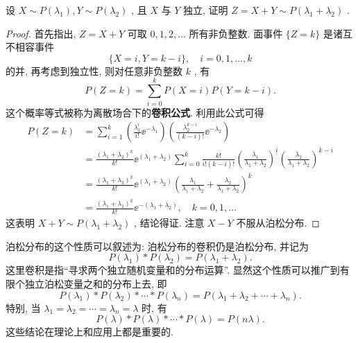    \begin{example}[(泊松分布的可加性)]\label{exam:3.3.2}
   	设 $X\sim P(\lambda_{1}),Y\sim P(\lambda_2)$ , 且 $X$ 与 $Y$ 独立, 证明 $Z=X+Y\sim P(\lambda_{1}+\lambda_{2})$ .
   	\begin{proof}
   		首先指出, $Z=X+Y$ 可取 $0,1,2,\ldots$ 所有非负整数. 面事件 $\{Z=k\}$ 是诸互不相容事件
   		\begin{equation*}
   			\{X=i,Y=k-i\},\quad i=0,1,\ldots,k
   		\end{equation*}
   		的并, 再考虑到独立性, 则对任意非负整数 $k$ , 有
   		\begin{equation}
   			P(Z=k)=\sum_{i=0}^{k}P(X=i)P(Y=k-i).\label{eq:3.3.1}
   		\end{equation}
   		这个概率等式被称为离散场合下的{\bfseries 卷积公式}. 利用此公式可得
   		\begin{align*}
   			P(Z=k) &=\sum_{i=1}^{k}\left(\frac{\lambda_{1}^i}{i!}\ee^{-\lambda_{1}}\right)\left(\frac{\lambda_2^{k-i}}{(k-i)!}\ee^{-\lambda_{2}}\right)\\
   			&=\frac{(\lambda_{1}+\lambda_{2})^k}{k!}\ee^{(\lambda_{1}+\lambda_{2})}\sum_{i=0}^{k}\frac{k!}{i!(k-i)!}\left(\frac{\lambda_{1}}{\lambda_{1}+\lambda_{2}}\right)^i\left(\frac{\lambda_{2}}{\lambda_{1}+\lambda_{2}}\right)^{k-i}\\
   			&=\frac{(\lambda_{1}+\lambda_{2})^k}{k!}\ee^{(\lambda_{1}+\lambda_{2})}\left(\frac{\lambda_{1}}{\lambda_{1}+\lambda_{2}}+\frac{\lambda_{2}}{\lambda_{1}+\lambda_{2}}\right)^k\\
   			&=\frac{(\lambda_{1}+\lambda_{2})^k}{k!}\ee^{-(\lambda_{1}+\lambda_{2})},\quad k=0,1,\ldots
   		\end{align*}
   		这表明 $X+Y\sim P(\lambda_{1}+\lambda_{2})$ , 结论得证. 注意 $X-Y$ 不服从泊松分布.
   	\end{proof}
   \end{example}
   泊松分布的这个性质可以叙述为: 泊松分布的卷积仍是泊松分布, 并记为
   \begin{equation}
   	P(\lambda_{1})\ast P(\lambda_{2})=P(\lambda_{1}+\lambda_{2}).\label{eq:3.3.2}
   \end{equation}
   这里卷积是指“寻求两个独立随机变量和的分布运算”. 显然这个性质可以推广到有限个独立泊松变量之和的分布上去, 即
   \begin{equation}
   	P(\lambda_{1})\ast P(\lambda_{2})\ast \cdots\ast P(\lambda_n)=P(\lambda_{1}+\lambda_{2}+\cdots+\lambda_n).\label{eq:3.3.3}
   \end{equation}
   特别, 当 $\lambda_{1}=\lambda_{2}=\cdots=\lambda_n=\lambda$ 时, 有
   \begin{equation}
   	P(\lambda)\ast P(\lambda)\ast\cdots\ast P(\lambda)=P(n\lambda).\label{eq:3.3.4}
   \end{equation}
   这些结论在理论上和应用上都是重要的.
   
